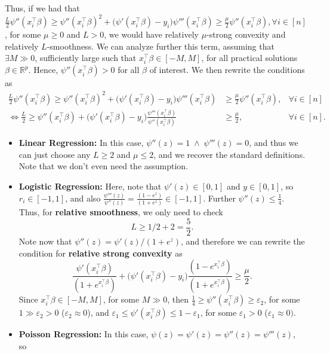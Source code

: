 \documentclass[11pt]{article}
\theoremstyle{plain}
\theoremstyle{definition}
\newcommand{\R}{\mathbb{R}}
\newcommand{\1}{\mathbf{1}}
\renewcommand{\t}{^{\top}}
\renewcommand{\R}{\mathbb{R}}
\begin{document}
Thus, if we had that $\frac{L}{2}\psi''(x_i\t\beta) \geq \psi''(x_i\t\beta)^2 + (\psi'(x_i\t\beta)-y_i\big)\psi'''(x_i\t\beta) \geq \frac{\mu}{2}\psi''(x_i\t\beta), \forall i \in [n]$, for some $\mu \geq 0$ and $L>0$, we would have relatively $\mu$-strong convexity and relatively $L$-smoothness. We can analyze further this term, {\color{red} assuming} that $\exists M \gg 0$, sufficiently large such that $x_i\t\beta \in [-M,M]$, for all {\color{red} practical solutions} $\beta \in \R^p$. Hence, $\psi''(x_i\t\beta) > 0$ for all $\beta$ of interest. We then rewrite the conditions as
\begin{align*}
   \frac{L}{2}\psi''(x_i\t\beta) \geq \psi''(x_i\t\beta)^2 + (\psi'(x_i\t\beta)-y_i\big)\psi'''(x_i\t\beta)& \geq \frac{\mu}{2}\psi''(x_i\t\beta), & \forall i \in [n]\\
  \iff  \frac{L}{2} \geq \psi''(x_i\t\beta) + (\psi'(x_i\t\beta)-y_i\big)\frac{\psi'''(x_i\t\beta)}{\psi''(x_i\t\beta)}& \geq \frac{\mu}{2}, & \forall i \in [n].
\end{align*}
\begin{tcolorbox}[
    colback=lightgray, %
    width=\linewidth, %
    sharp corners=all %
]
\begin{itemize}
    \item \textbf{Linear Regression:} In this case, $\psi''(z)=1 \;\wedge\; \psi'''(z)=0$, and thus we can just choose any $L\geq2$ and $\mu \leq 2$, and we recover the standard definitions. Note that we don't even need the assumption. 

    \item \textbf{Logistic Regression:} Here, note that $\psi'(z)\in [0,1]$ and $y\in[0,1]$, so $r_i \in [-1,1]$, and also $\frac{\psi'''(z)}{\psi''(z)}= \frac{(1-e^z)}{(1+e^z)} \in [-1,1]$. Further $\psi''(z)\leq \frac{1}{4}$. Thus, for \textbf{relative smoothness}, we only need to check $${L}\geq 1/2 + 2 = \frac{5}{2}.$$
    Note now that $\psi''(z)=\psi'(z)/(1+e^z)$, and therefore we can rewrite the condition for \textbf{relative strong convexity} as
    $$
    \frac{\psi'(x_i\t\beta)}{(1+e^{x_i\t\beta})} + (\psi'(x_i\t\beta)-y_i\big)\frac{(1-e^{x_i\t\beta})}{(1+e^{x_i\t\beta})} \geq \frac{\mu}{2}.
    $$
    Since $x_i\t\beta \in [-M,M]$, for some $M\gg0$, then $\frac{1}{4}\geq\psi''(x_i\t\beta)\geq \varepsilon_2$, for some $1\gg \varepsilon_2 > 0$ ($\varepsilon_2 \approx 0$), and $\varepsilon_1 \leq \psi'(x_i\t\beta)\leq 1-\varepsilon_1$, for some $\varepsilon_1 >0$ ($\varepsilon_1\approx0)$. 
    \item \textbf{Poisson Regression:} In this case, $\psi(z)=\psi'(z)=\psi''(z)=\psi'''(z)$, so 
\end{itemize}
\end{tcolorbox}
\end{document}
